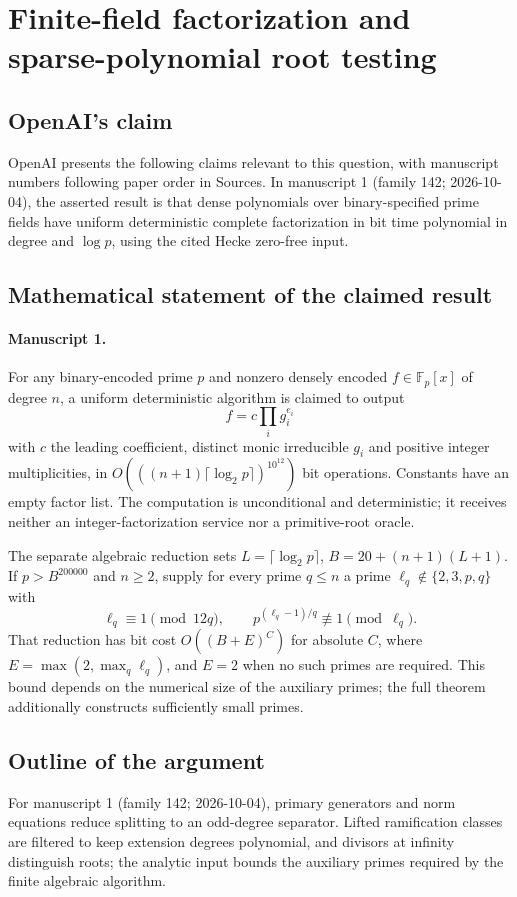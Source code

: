 \documentclass[11pt]{article}
\begin{document}
\section*{Finite-field factorization and sparse-polynomial root testing}

\subsection{OpenAI's claim}
OpenAI presents the following claims relevant to this question, with manuscript numbers following paper order in Sources. In manuscript 1 (family 142; 2026-10-04), the asserted result is that dense polynomials over binary-specified prime fields have uniform deterministic complete factorization in bit time polynomial in degree and $\log p$, using the cited Hecke zero-free input.

\subsection{Mathematical statement of the claimed result}
\paragraph{Manuscript 1.}
For any binary-encoded prime $p$ and nonzero densely encoded $f\in\mathbb F_p[x]$ of degree $n$, a uniform deterministic algorithm is claimed to output
\[
 f=c\prod_i g_i^{e_i}
\]
with $c$ the leading coefficient, distinct monic irreducible $g_i$ and positive integer multiplicities, in $O(((n+1)\lceil\log_2p\rceil)^{10^{12}})$ bit operations. Constants have an empty factor list. The computation is unconditional and deterministic; it receives neither an integer-factorization service nor a primitive-root oracle.

The separate algebraic reduction sets $L=\lceil\log_2p\rceil$, $B=20+(n+1)(L+1)$. If $p>B^{200000}$ and $n\ge2$, supply for every prime $q\le n$ a prime $\ell_q\notin\{2,3,p,q\}$ with
\[
 \ell_q\equiv1\pmod{12q},\qquad p^{(\ell_q-1)/q}\not\equiv1\pmod{\ell_q}.
\]
That reduction has bit cost $O((B+E)^C)$ for absolute $C$, where $E=\max(2,\max_q\ell_q)$, and $E=2$ when no such primes are required. This bound depends on the numerical size of the auxiliary primes; the full theorem additionally constructs sufficiently small primes.

\subsection{Outline of the argument}
For manuscript 1 (family 142; 2026-10-04), primary generators and norm equations reduce splitting to an odd-degree separator. Lifted ramification classes are filtered to keep extension degrees polynomial, and divisors at infinity distinguish roots; the analytic input bounds the auxiliary primes required by the finite algebraic algorithm.
\end{document}
